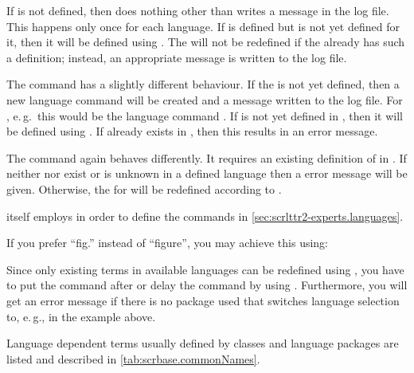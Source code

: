 If  is not defined, then  does
nothing other than writes a message in the log file. This happens only once
for each language.  If  is defined but  is not yet
defined for it, then it will be defined using .  The
 will not be redefined if the  already has such a
definition; instead, an appropriate message is written to the log file.

The command  has a slightly different behaviour.  If the
 is not yet defined, then a new language command will be
created and a message written to the log file. For 
, e.\,g.\, this would be the language command
. If  is not yet defined in
, then it will be defined using .  If
 already exists in , then this results in an error
message.

The command  again behaves differently. It requires an
existing definition of  in .  If neither
 nor  exist or  is unknown in a
defined language then a error message will be given. Otherwise, the
 for  will be redefined according to
.

\KOMAScript{} itself employs  in order to define the
commands in \autoref{sec:scrlttr2-experts.languages}.

\begin{Example}
  If you prefer ``fig.'' instead of ``figure'', you may achieve this using:
\begin{lstcode}
\end{lstcode}
\end{Example}
  
Since only existing terms in available languages can be
redefined using , you have to put the command after
 or delay the command by using
. Furthermore, you will get an error message if there
is no package used that switches language selection to, e.\,g.,
 in the example above.

Language dependent terms usually defined by classes and language
packages are listed and described in \autoref{tab:scrbase.commonNames}.

